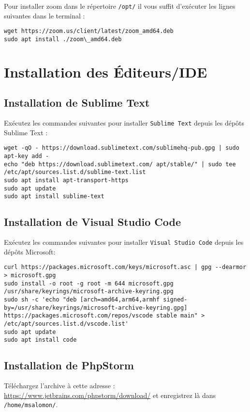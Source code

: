 Pour installer zoom dans le répertoire \texttt{/opt/} il vous suffit d'exécuter les lignes suivantes dans le terminal :

\begin{lstlisting}
wget https://zoom.us/client/latest/zoom_amd64.deb
sudo apt install ./zoom\_amd64.deb
\end{lstlisting}

\section{Installation des Éditeurs/IDE}

\subsection{Installation de Sublime Text}

Exécutez les commandes suivantes pour installer \texttt{Sublime Text} depuis les dépôts Sublime Text :

\begin{lstlisting}
wget -qO - https://download.sublimetext.com/sublimehq-pub.gpg | sudo apt-key add -
echo "deb https://download.sublimetext.com/ apt/stable/" | sudo tee /etc/apt/sources.list.d/sublime-text.list
sudo apt install apt-transport-https
sudo apt update
sudo apt install sublime-text
\end{lstlisting}

\subsection{Installation de Visual Studio Code}

Exécutez les commandes suivantes pour installer \texttt{Visual Studio Code} depuis les dépôts Microsoft:

\begin{lstlisting}
curl https://packages.microsoft.com/keys/microsoft.asc | gpg --dearmor > microsoft.gpg
sudo install -o root -g root -m 644 microsoft.gpg /usr/share/keyrings/microsoft-archive-keyring.gpg
sudo sh -c 'echo "deb [arch=amd64,arm64,armhf signed-by=/usr/share/keyrings/microsoft-archive-keyring.gpg] https://packages.microsoft.com/repos/vscode stable main" > /etc/apt/sources.list.d/vscode.list'
sudo apt update
sudo apt install code
\end{lstlisting}

\subsection{Installation de PhpStorm}
Téléchargez l'archive à cette adresse : \href{https://www.jetbrains.com/phpstorm/download/}{https://www.jetbrains.com/phpstorm/download/} et enregistrez là dans \texttt{/home/msalomon/}.

